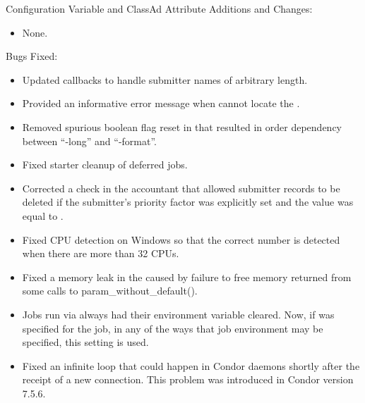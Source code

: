 \noindent Configuration Variable and ClassAd Attribute Additions and Changes:

\begin{itemize}

\item None.

\end{itemize}

\noindent Bugs Fixed:

\begin{itemize}

\item Updated  callbacks to handle submitter names of arbitrary length.

\item Provided an informative error message when  cannot locate the .

\item Removed spurious boolean flag reset in  that resulted in order dependency between ``-long'' and ``-format''.

\item Fixed starter cleanup of deferred jobs.

\item Corrected a check in the accountant that allowed submitter records
to be deleted if the submitter's priority factor was explicitly set and
the value was equal to .

\item Fixed CPU detection on Windows so that the correct number is detected
when there are more than 32 CPUs.

\item Fixed a memory leak in the  caused by failure to
free memory returned from some calls to param\_without\_default().

\item Jobs run via  always had their  environment
variable cleared.  Now, if  was specified for the job, 
in any of the ways that job environment may be specified, 
this setting is used.

\item Fixed an infinite loop that could happen in Condor daemons
shortly after the receipt of a new connection.  
This problem was introduced in Condor version 7.5.6.


\end{itemize}
